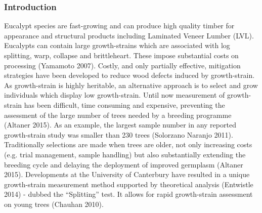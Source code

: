 \subsubsection*{Introduction}
Eucalypt species are fast-growing and can produce high quality timber for appearance and structural products including Laminated Veneer Lumber (LVL). Eucalypts can contain large growth-strains which are associated with log splitting, warp, collapse and brittleheart. These impose substantial costs on processing (Yamamoto 2007). Costly, and only partially effective, mitigation strategies have been developed to reduce wood defects induced by growth-strain. As growth-strain is highly heritable, an alternative approach is to select and grow individuals which display low growth-strain. Until now measurement of growth-strain has been difficult, time consuming and expensive, preventing the assessment of the large number of trees needed by a breeding programme (Altaner 2015). As an example, the largest sample number in any reported growth-strain study was smaller than 230 trees (Solorzano Naranjo 2011). Traditionally selections are made when trees are older, not only increasing costs (e.g. trial management, sample handling) but also substantially extending the breeding cycle and delaying the deployment of improved germplasm (Altaner 2015). Developments at the University of Canterbury have resulted in a unique growth-strain measurement method supported by theoretical analysis (Entwistle 2014) - dubbed the “Splitting” test. It allows for rapid growth-strain assessment on young trees (Chauhan 2010).

